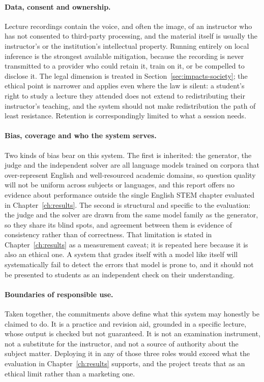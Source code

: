 \paragraph{Data, consent and ownership.} Lecture recordings contain the voice,
and often the image, of an instructor who has not consented to third-party
processing, and the material itself is usually the instructor's or the
institution's intellectual property. Running entirely on local inference is the
strongest available mitigation, because the recording is never transmitted to a
provider who could retain it, train on it, or be compelled to disclose it. The
legal dimension is treated in Section~\ref{sec:impacts-society}; the ethical
point is narrower and applies even where the law is silent: a student's right to
study a lecture they attended does not extend to redistributing their
instructor's teaching, and the system should not make redistribution the path of
least resistance. Retention is correspondingly limited to what a session needs.

\paragraph{Bias, coverage and who the system serves.} Two kinds of bias bear on
this system. The first is inherited: the generator, the judge and the
independent solver are all language models trained on corpora that
over-represent English and well-resourced academic domains, so question quality
will not be uniform across subjects or languages, and this report offers no
evidence about performance outside the single English STEM chapter evaluated in
Chapter~\ref{ch:results}. The second is structural and specific to the
evaluation: the judge and the solver are drawn from the same model family as the
generator, so they share its blind spots, and agreement between them is evidence
of consistency rather than of correctness. That limitation is stated in
Chapter~\ref{ch:results} as a measurement caveat; it is repeated here because it
is also an ethical one. A system that grades itself with a model like itself
will systematically fail to detect the errors that model is prone to, and it
should not be presented to students as an independent check on their
understanding.

\paragraph{Boundaries of responsible use.} Taken together, the commitments above
define what this system may honestly be claimed to do. It is a practice and
revision aid, grounded in a specific lecture, whose output is checked but not
guaranteed. It is not an examination instrument, not a substitute for the
instructor, and not a source of authority about the subject matter. Deploying it
in any of those three roles would exceed what the evaluation in
Chapter~\ref{ch:results} supports, and the project treats that as an ethical
limit rather than a marketing one.

